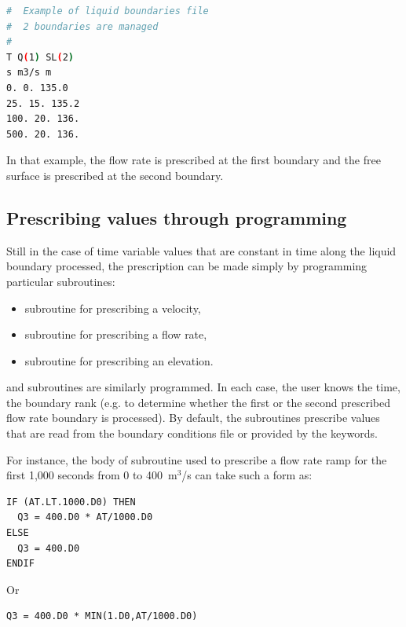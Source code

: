 \begin{lstlisting}[language=bash]
#  Example of liquid boundaries file
#  2 boundaries are managed
#
T Q(1) SL(2)
s m3/s m
0. 0. 135.0
25. 15. 135.2
100. 20. 136.
500. 20. 136.
\end{lstlisting}

In that example, the flow rate is prescribed at the first boundary and the free
surface is prescribed at the second boundary.


\subsection{Prescribing values through programming}

Still in the case of time variable values that are constant in time along the
liquid boundary processed, the prescription can be made simply by programming
particular subroutines:

\begin{itemize}
\item {} subroutine for prescribing a velocity,

\item {} subroutine for prescribing a flow rate,

\item {} subroutine for prescribing an elevation.
\end{itemize}

 and  subroutines are similarly programmed.
In each case, the user knows the time, the boundary rank (e.g. to determine
whether the first or the second prescribed flow rate boundary is processed).
By default, the subroutines prescribe values that are read from the boundary
conditions file or provided by the keywords.

For instance, the body of subroutine  used to prescribe a flow rate
ramp for the first 1,000 seconds from 0 to 400~m${}^{3}$/s can take such a form as:

\begin{lstlisting}[language=TelFortran]
IF (AT.LT.1000.D0) THEN
  Q3 = 400.D0 * AT/1000.D0
ELSE
  Q3 = 400.D0
ENDIF
\end{lstlisting}

Or

\begin{lstlisting}[language=TelFortran]
Q3 = 400.D0 * MIN(1.D0,AT/1000.D0)
\end{lstlisting}


